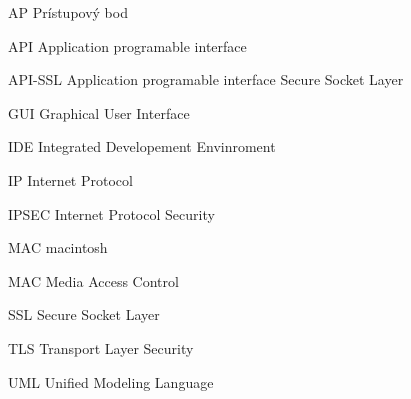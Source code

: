 \begin{seznamzkratek}{90}
	
		{AP}								%
		{Prístupový bod}	
	
		{API}								%
		{Application programable interface}
	
	
		{API-SSL}								%
		{Application programable interface Secure Socket Layer}	
	
		{GUI}								%
		{Graphical User Interface}	
	
		{IDE}								%
		{Integrated Developement Envinroment}		
	
		{IP}								%
		{Internet Protocol}	
	
		{IPSEC}								%
		{Internet Protocol Security}
	
		{MAC}								%
		{macintosh}
		
		{MAC}								%
		{Media Access Control}	
	
		{SSL}								%
		{Secure Socket Layer}
	
		{TLS}								%
		{Transport Layer Security}	
	
		{UML}								%
		{Unified Modeling Language}

												
\end{seznamzkratek}
